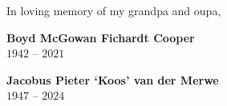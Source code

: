 \begin{dedication} \noindent


    In loving memory of my grandpa and oupa,

    \vspace{\baselineskip}

    \textbf{\large Boyd McGowan Fichardt Cooper} \\
    $1942$ -- $2021$

    \vspace{\baselineskip}

    \textbf{\large Jacobus Pieter `Koos' van der Merwe} \\
    $1947$ -- $2024$


\end{dedication}

